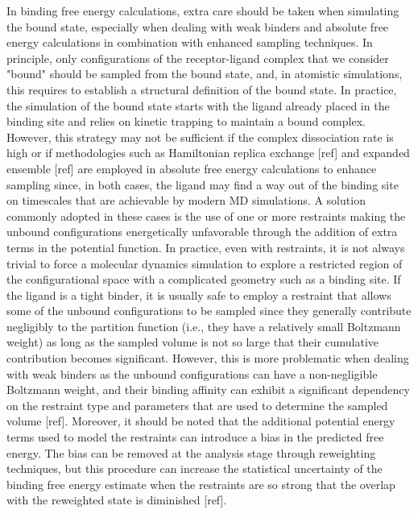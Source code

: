 \documentclass[9pt,bestpractices]{livecoms}
\begin{document}
In binding free energy calculations, extra care should be taken when simulating the bound state, especially when dealing with weak binders and absolute free energy calculations in combination with enhanced sampling techniques.
In principle, only configurations of the receptor-ligand complex that we consider "bound" should be sampled from the bound state, and, in atomistic simulations, this requires to establish a structural definition of the bound state.
In practice, the simulation of the bound state starts with the ligand already placed in the binding site and relies on kinetic trapping to maintain a bound complex.
However, this strategy may not be sufficient if the complex dissociation rate is high or if methodologies such as Hamiltonian replica exchange [ref] and expanded ensemble [ref] are employed in absolute free energy calculations to enhance sampling since, in both cases, the ligand may find a way out of the binding site on timescales that are achievable by modern MD simulations.
A solution commonly adopted in these cases is the use of one or more restraints making the unbound configurations energetically unfavorable through the addition of extra terms in the potential function.
In practice, even with restraints, it is not always trivial to force a molecular dynamics simulation to explore a restricted region of the configurational space with a complicated geometry such as a binding site.
If the ligand is a tight binder, it is usually safe to employ a restraint that allows some of the unbound configurations to be sampled since they generally contribute negligibly to the partition function (i.e., they have a relatively small Boltzmann weight) as long as the sampled volume is not so large that their cumulative contribution becomes significant.
However, this is more problematic when dealing with weak binders as the unbound configurations can have a non-negligible Boltzmann weight, and their binding affinity can exhibit a significant dependency on the restraint type and parameters that are used to determine the sampled volume [ref].
Moreover, it should be noted that the additional potential energy terms used to model the restraints can introduce a bias in the predicted free energy.
The bias can be removed at the analysis stage through reweighting techniques, but this procedure can increase the statistical uncertainty of the binding free energy estimate when the restraints are so strong that the overlap with the reweighted state is diminished [ref].
\end{document}
